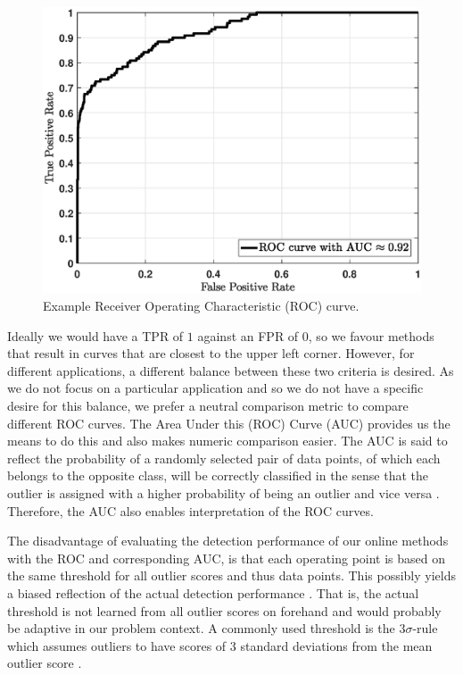 \begin{figure}[h]
	\centering
	\vspace{-0.15cm}
	\includegraphics[scale=0.38]{analysis/Example_ROC}
	\caption{Example Receiver Operating Characteristic (ROC) curve.}
	\label{analysis:roc_example}
\end{figure}

Ideally we would have a TPR of $1$ against an FPR of $0$, so we favour methods that result in curves that are closest to the upper left corner. However, for different applications, a different balance between these two criteria is desired. As we do not focus on a particular application and so we do not have a specific desire for this balance, we prefer a neutral comparison metric to compare different ROC curves. The Area Under this (ROC) Curve (AUC) provides us the means to do this and also makes numeric comparison easier. The AUC is said to reflect the probability of a randomly selected pair of data points, of which each belongs to the opposite class, will be correctly classified in the sense that the outlier is assigned with a higher probability of being an outlier and vice versa \cite{hanley1982meaning}. Therefore, the AUC also enables interpretation of the ROC curves. 

The disadvantage of evaluating the detection performance of our online methods with the ROC and corresponding AUC, is that each operating point is based on the same threshold for all outlier scores and thus data points. This possibly yields a biased reflection of the actual detection performance \cite{mchugh2000testing}. That is, the actual threshold is not learned from all outlier scores on forehand and would probably be adaptive in our problem context. A commonly used threshold is the $3\sigma$-rule which assumes outliers to have scores of $3$ standard deviations from the mean outlier score \cite{zimek2012survey}. 


